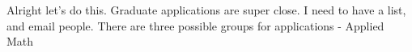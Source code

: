 \noindent {}

Alright let's do this. Graduate applications are super close. I need to have a list, and email people. There are three possible groups for applications - Applied Math 

